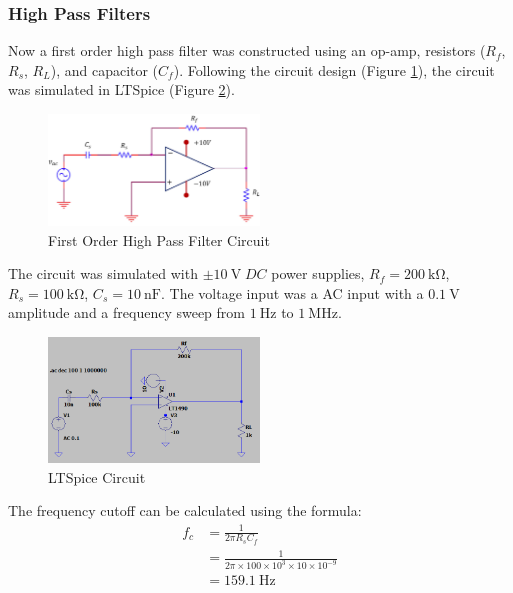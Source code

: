 \documentclass[12pt]{article}
\begin{document}
\subsubsection{High Pass Filters}
Now a first order high pass filter was constructed using an op-amp, resistors
($R_f$, $R_s$, $R_L$), and capacitor ($C_f$). Following the circuit design
(Figure \ref{fig:FirstOrderActiveHighPassFilter}), the circuit was simulated in LTSpice (Figure \ref{fig:1.5Circuit}).
\begin{figure}[H]
  \centering
  \includegraphics[width=0.5\textwidth]{photos/First Order Active High Pass Filter.png}
  \caption{First Order High Pass Filter Circuit}
  \label{fig:FirstOrderActiveHighPassFilter}
\end{figure}

The circuit was simulated with $\pm \SI{10}{\volt} \; DC$ power supplies,
$R_f = \SI{200}{\kilo\ohm}$, $R_s = \SI{100}{\kilo\ohm}$, $C_s = \SI{10}{\nano\farad}$.
The voltage input was a AC input with a $\SI{0.1}{\volt}$ amplitude and a frequency sweep from $\SI{1}{\hertz}$
to $\SI{1}{\mega\hertz}$.

\begin{figure}[H]
  \centering
  \includegraphics[width=0.5\textwidth]{Lab 10 Shared/1.5 circuit.PNG}
  \caption{LTSpice Circuit}
  \label{fig:1.5Circuit}
\end{figure}

The frequency cutoff can be calculated using the formula:
\[
  \begin{aligned}
	f_c & = \frac{1}{2\pi R_s C_f}                                         \\
	& = \frac{1}{2\pi \times 100 \times 10^3 \times 10 \times 10^{-9}} \\
	& = \SI{159.1}{\hertz}
  \end{aligned}
\]
\end{document}
